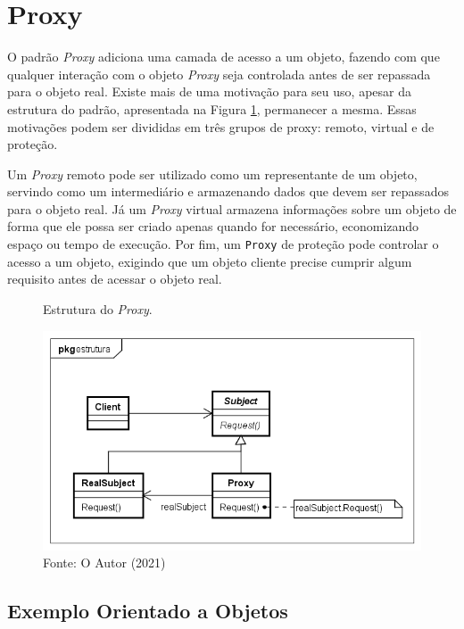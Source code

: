 \section{Proxy}

O padrão \textit{Proxy} adiciona uma camada de acesso 
a um objeto, fazendo com que qualquer interação 
com o objeto \textit{Proxy} seja controlada antes de ser 
repassada para o objeto real. Existe mais 
de uma motivação para seu uso, apesar 
da estrutura do padrão, 
apresentada na Figura \ref{proxy_struct},  
permanecer a mesma. Essas motivações 
podem ser divididas em três grupos de 
proxy: remoto, virtual e de proteção. \cite{gamma:1995}

Um \textit{Proxy} remoto pode ser utilizado como um 
representante de um objeto, servindo como um 
intermediário e armazenando dados que devem 
ser repassados para o objeto real. Já um 
\textit{Proxy} virtual armazena informações sobre 
um objeto de forma que ele possa ser criado 
apenas quando for necessário, economizando 
espaço ou tempo de execução. Por fim, um 
\texttt{Proxy} de proteção pode controlar o acesso 
a um objeto, exigindo que um objeto cliente 
precise cumprir algum requisito antes de 
acessar o objeto real. \cite{gamma:1995}

\begin{figure}[htb]
	\caption{\label{proxy_struct}Estrutura do \textit{Proxy}.}
	\begin{center}
	    \includegraphics[scale=0.5]{5_padroes-contexto-funcional/5.2_estruturais/5.2.7_proxy/proxy_estrutura.png}
	\end{center}
  \caption*{Fonte: O Autor (2021)}
\end{figure}

\subsection*{Exemplo Orientado a Objetos}

